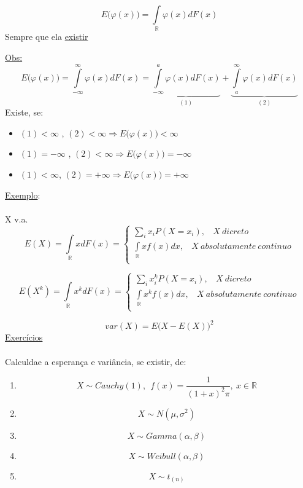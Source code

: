 \documentclass[a4paper,12pt]{article}
\begin{document}
\begin{enumerate}[label=\arabic*)]
	$$E\bigg(\varphi(x)\bigg) =\int\limits_{\mathbb R} \varphi(x)dF(x) $$
	Sempre que ela \underline{existir}
	
	
	\underline{Obs:}
	$$E\bigg(\varphi(x)\bigg) =\int\limits_{-\infty}^{\infty} \varphi(x)dF(x) 
	=
	\underbrace{\int\limits_{-\infty}^{a} \varphi(x)dF(x) }_{(1)}
	+
	\underbrace{\int\limits_{a}^{\infty} \varphi(x)dF(x) }_{(2)}
	$$
	Existe, se:
	\begin{itemize}
		\item $(1)<\infty$ , $(2) < \infty \Rightarrow E\bigg(\varphi(x)\bigg)<\infty$
		
				\item $(1)=-\infty$ , $(2) < \infty \Rightarrow E\bigg(\varphi(x)\bigg)=-\infty$
				
						\item $(1)<\infty$, $(2) =+ \infty \Rightarrow E\bigg(\varphi(x)\bigg)=+\infty$
		
	\end{itemize}
	
\end{enumerate}
\newpage 
\underline{Exemplo}:\\
\\
X v.a.
$$E(X) = \int\limits_{\mathbb R }x dF(x)= \begin{cases}
\sum\limits_i x_iP(X=x_i), \ \ \ \ X \ dicreto\\
 \int\limits_{\mathbb R }x f(x)dx, \ \ \ \ X \ absolutamente \ continuo\\
\end{cases}
 $$

$$E(X^k) = \int\limits_{\mathbb R} x^k dF(x)= \begin{cases}
\sum\limits_i x_i^kP(X=x_i), \ \ \ \ X \ dicreto\\
\int\limits_{\mathbb R }x^k f(x)dx, \ \ \ \ X \ absolutamente \ continuo\\
\end{cases} $$

$$var(X) = E\bigg(X - E(X)\bigg)^2 $$
\underline{Exercícios}\\
\\
Calculdae a esperança e variância, se existir, de:
\begin{enumerate}[label = \arabic*)]
	\item $$X\sim Cauchy(1), \ \ f(x) = \frac{1}{(1+x)^2\pi}, \ x\in \mathbb R $$
	
	\item $$X\sim N(\mu,\sigma^2) $$
	
	\item $$X\sim Gamma(\alpha,\beta) $$
	\item $$X\sim Weibull(\alpha,\beta) $$
	\item $$X\sim t_{(n)} $$
	
	
\end{enumerate}
\end{document}
